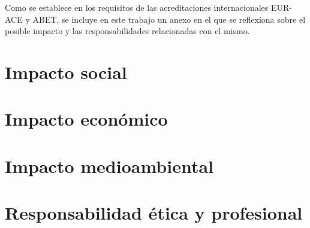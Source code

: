 Como se establece en los requisitos de las acreditaciones internacionales EUR-ACE y ABET, se incluye en este trabajo un anexo en el que se reflexiona sobre el posible impacto y las responsabilidades relacionadas con el mismo.

\section{Impacto social} 

\section{Impacto económico}

\section{Impacto medioambiental}

\section{Responsabilidad ética y profesional}
